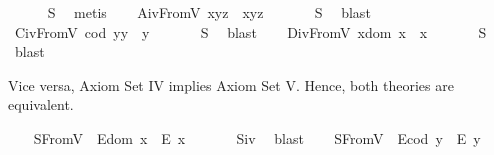 \begin{isabellebody}
%
\isadelimproof
\ \ \ \ %
\endisadelimproof
%
\isatagproof
{}\isamarkupfalse%
\ S{}\ \isamarkupfalse%
\ metis%
\endisatagproof
{\isafoldproof}%
%
\isadelimproof
\isanewline
%
\endisadelimproof
\ \ \isamarkupfalse%
\ A\isactrlsub i\isactrlsub vFromV{\isacharcolon}\ {\isachardoublequoteopen}x{\isasymcdot}{\isacharparenleft}y{\isasymcdot}z{\isacharparenright}\ {\isasymcong}\ {\isacharparenleft}x{\isasymcdot}y{\isacharparenright}{\isasymcdot}z{\isachardoublequoteclose}\ \isanewline
%
\isadelimproof
\ \ \ \ %
\endisadelimproof
%
\isatagproof
{}\isamarkupfalse%
\ S{}\ \isamarkupfalse%
\ blast%
\endisatagproof
{\isafoldproof}%
%
\isadelimproof
\isanewline
%
\endisadelimproof
\ \ \isamarkupfalse%
\ C\isactrlsub i\isactrlsub vFromV{\isacharcolon}\ {\isachardoublequoteopen}{\isacharparenleft}cod\ y{\isacharparenright}{\isasymcdot}y\ {\isasymcong}\ y{\isachardoublequoteclose}\ \isanewline
%
\isadelimproof
\ \ \ \ %
\endisadelimproof
%
\isatagproof
{}\isamarkupfalse%
\ S{}\ \isamarkupfalse%
\ blast%
\endisatagproof
{\isafoldproof}%
%
\isadelimproof
\isanewline
%
\endisadelimproof
\ \ \isamarkupfalse%
\ D\isactrlsub i\isactrlsub vFromV{\isacharcolon}\ {\isachardoublequoteopen}x{\isasymcdot}{\isacharparenleft}dom\ x{\isacharparenright}\ {\isasymcong}\ x{\isachardoublequoteclose}\ \isanewline
%
\isadelimproof
\ \ \ \ %
\endisadelimproof
%
\isatagproof
{}\isamarkupfalse%
\ S{}\ \isamarkupfalse%
\ blast%
\endisatagproof
{\isafoldproof}%
%
\isadelimproof
%
\endisadelimproof
%
\begin{isamarkuptext}%
Vice versa, Axiom Set IV implies Axiom Set V. Hence, both theories are
 equivalent.%
\end{isamarkuptext}\isamarkuptrue%
\ \ \isamarkupfalse%
\ S{}FromV{\isacharcolon}\ \ {\isachardoublequoteopen}E{\isacharparenleft}dom\ x{\isacharparenright}\ \isactrlbold {\isasymrightarrow}\ E\ x{\isachardoublequoteclose}\ \isanewline
%
\isadelimproof
\ \ \ \ %
\endisadelimproof
%
\isatagproof
{}\isamarkupfalse%
\ S\isactrlsub i\isactrlsub v\ \isamarkupfalse%
\ blast%
\endisatagproof
{\isafoldproof}%
%
\isadelimproof
\isanewline
%
\endisadelimproof
\ \ \isamarkupfalse%
\ S{}FromV{\isacharcolon}\ \ {\isachardoublequoteopen}E{\isacharparenleft}cod\ y{\isacharparenright}\ \isactrlbold {\isasymrightarrow}\ E\ y{\isachardoublequoteclose}\ \isanewline

\end{isabellebody}
